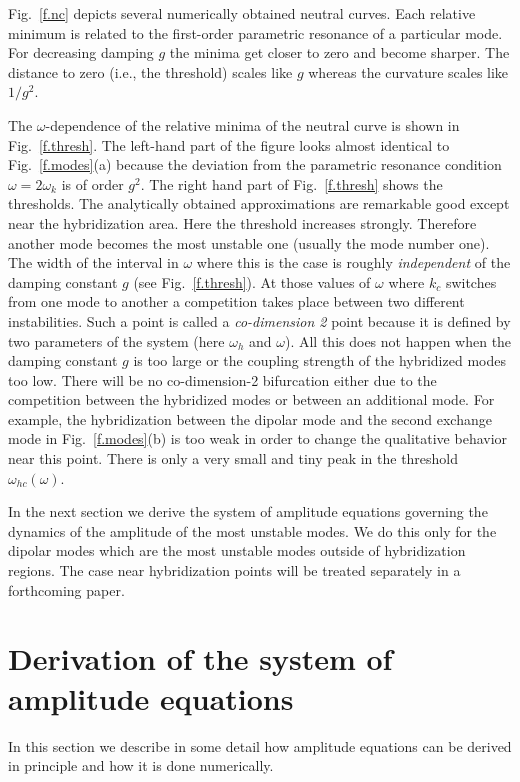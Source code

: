 Fig.~\ref{f.nc} depicts several numerically obtained neutral curves. 
Each relative minimum is related to the first-order
parametric resonance of a particular mode. For decreasing damping $g$
the minima get closer to zero and become sharper. The distance to
zero (i.e., the threshold) scales like $g$ whereas the curvature
scales like $1/g^2$. 

The $\omega$-dependence of the relative minima of the neutral curve 
is shown in Fig.~\ref{f.thresh}. The left-hand part of the figure
looks almost identical to Fig.~\ref{f.modes}(a) because the deviation
from the parametric resonance condition $\omega=2\omega_k$ is of
order $g^2$.  The right hand part of Fig.~\ref{f.thresh} shows the
thresholds. The analytically obtained approximations are 
remarkable good except near the hybridization area. Here the
threshold increases strongly. Therefore another mode becomes the
most unstable one (usually the mode number one). 
The width of the interval in $\omega$ where
this is the case is roughly {\em independent\/} of the damping
constant $g$ (see Fig.~\ref{f.thresh}). At those values of $\omega$
where $k_c$ switches from one mode to another a competition takes
place between two different instabilities. Such a point is called a
{\em co-dimension 2\/} point because it is defined by two
parameters of the system (here $\omega_h$ and $\omega$). All this
does not happen when the damping constant $g$ is too large or the
coupling strength of the hybridized modes too low. There will be no
co-dimension-2 bifurcation either due to the competition between the
hybridized modes or between an additional mode. For example, the
hybridization between the dipolar mode and the second exchange mode
in Fig.~\ref{f.modes}(b) is too weak in order to change the
qualitative behavior near this point. There is only a very small and
tiny peak in the threshold $\omega_{hc}(\omega)$.

In the next section we derive the system of amplitude equations
governing the dynamics of the amplitude of the most unstable modes.
We do this only for the dipolar modes which are the most unstable
modes outside of  hybridization regions. The case near hybridization
points will be treated separately in a forthcoming paper.


\section{\protect\label{DLEQ}Derivation of the system of amplitude
equations}

In this section we describe in some detail how amplitude
equations can be derived in principle and how it is done numerically. 

